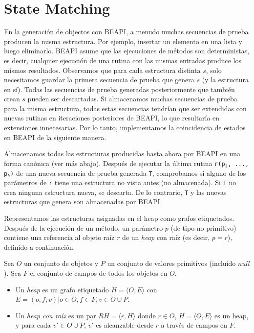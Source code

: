 \section{State Matching}
\label{sec:stateMatching}

En la generación de objectos con \textsf{BEAPI}, a menudo muchas secuencias de prueba producen la misma estructura. Por ejemplo, insertar un elemento en una lista y luego eliminarlo. \textsf{BEAPI} asume que las ejecuciones de métodos son deterministas, es decir, cualquier ejecución de una rutina con las mismas entradas produce los mismos resultados. Observamos que para cada estructura distinta $s$, solo necesitamos guardar la primera secuencia de prueba que genera $s$ (y la estructura en sí). Todas las secuencias de prueba generadas posteriormente que también crean $s$ pueden ser descartadas. Si almacenamos muchas secuencias de prueba para la misma estructura, todas estas secuencias tendrían que ser extendidas con nuevas rutinas en iteraciones posteriores de \textsf{BEAPI}, lo que resultaría en extensiones innecesarias. Por lo tanto, implementamos la coincidencia de estados en \textsf{BEAPI} de la siguiente manera.

Almacenamos todas las estructuras producidas hasta ahora por \textsf{BEAPI} en una forma canónica (ver más abajo). Después de ejecutar la última rutina \texttt{r(p$_1$, ..., p$_k$)} de una nueva secuencia de prueba generada \texttt{T}, comprobamos si alguno de los parámetros de \texttt{r} tiene una estructura no vista antes (no almacenada). Si \texttt{T} no crea ninguna estructura nueva, se descarta. De lo contrario, \texttt{T} y las nuevas estructuras que genera son almacenadas por \textsf{BEAPI}.

Representamos las estructuras asignadas en el heap como grafos etiquetados. Después de la ejecución de un método, un parámetro $p$ (de tipo no primitivo) contiene una referencia al objeto raíz $r$ de un \emph{heap} con raíz (es decir, $p=r$), definido a continuación.

\begin{definition}
Sea $O$ un conjunto de objetos y $P$ un conjunto de valores primitivos (incluido $null$). Sea $F$ el conjunto de campos de todos los objetos en $O$.
\begin{itemize}
\item Un \emph{heap} es un grafo etiquetado $H = \langle O, E\rangle$ con $E = {(o, f, v) | o \in O, f \in F, v \in O \cup P}$.
\item Un \emph{heap con raíz} es un par $RH = \langle r, H \rangle$ donde $r \in O$, $H = \langle O, E\rangle$ es un heap, y para cada $v' \in O \cup P$, $v'$ es alcanzable desde $r$ a través de campos en $F$.
\end{itemize}
\end{definition}

